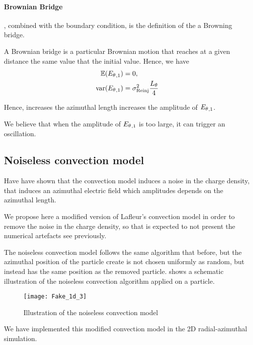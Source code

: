     \paragraph{Brownian Bridge}
      , combined with the boundary condition, is the definition of the a Browning bridge.
      
      A Brownian bridge is a particular Brownian motion that reaches at a given distance the same value that the initial value.
      Hence, we have
      \begin{align*}
        \mathbb{E}({E_{\theta}}_{, 1}) &= 0,  \\
        {\rm var}({E_{\theta}}_{, 1}) &= \sigma_{\rm Reinj}^2 \frac{L_{\theta}}{4}
      \end{align*}
    
      Hence, increases the azimuthal length increases the amplitude of ${E_{\theta}}_{, 1}$.
      
    
    We believe that when the amplitude of ${E_{\theta}}_{, 1}$ is too large, it can trigger an oscillation.
    
    \subsection{Noiseless convection model}
      \label{sec-noiselessresults}
      Have have shown that the convection model induces a noise in the charge density, that induces an azimuthal electric field which amplitudes depends on the azimuthal length.
      
      We propose here a modified version of Lafleur's convection model in order to remove the noise in the charge density, so that is expected to not present the numerical artefacts see previously.
      
      The noiseless convection model follows the same algorithm that before, but the azimuthal position of the particle create is not chosen uniformly as random, but instead has the same position as the removed particle.
       shows a schematic illustration of the noiseless convection algorithm applied on a particle.
      
      \begin{figure}[hbtp]
        \centering
        \texttt{[image: Fake\_1d\_3]}
        \caption{Illustration of the noiseless convection model}
        \label{fig-fakez3}
      \end{figure}
      
      We have implemented this modified convection model in the \ac{2D} radial-azimuthal simulation.
      
